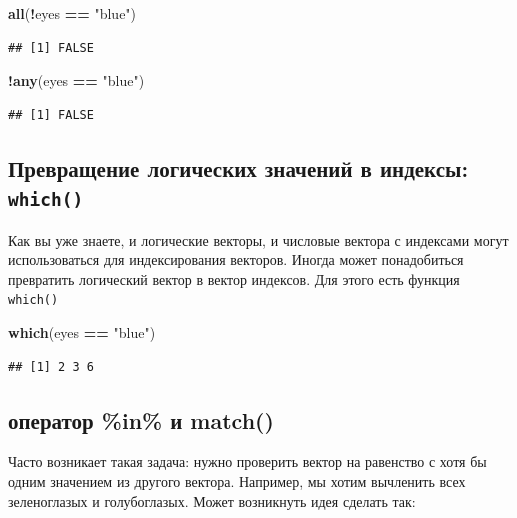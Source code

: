 \documentclass[]{book}
\newenvironment{Shaded}{\begin{snugshade}}{\end{snugshade}}
\newcommand{\KeywordTok}[1]{\textcolor[rgb]{0.13,0.29,0.53}{\textbf{#1}}}
\newcommand{\StringTok}[1]{\textcolor[rgb]{0.31,0.60,0.02}{#1}}
\newcommand{\OperatorTok}[1]{\textcolor[rgb]{0.81,0.36,0.00}{\textbf{#1}}}
\newcommand{\NormalTok}[1]{#1}
\begin{document}
\begin{Shaded}
\begin{Highlighting}[]
\KeywordTok{all}\NormalTok{(}\OperatorTok{!}\NormalTok{eyes }\OperatorTok{==}\StringTok{ "blue"}\NormalTok{)}
\end{Highlighting}
\end{Shaded}

\begin{verbatim}
## [1] FALSE
\end{verbatim}

\begin{Shaded}
\begin{Highlighting}[]
\OperatorTok{!}\KeywordTok{any}\NormalTok{(eyes }\OperatorTok{==}\StringTok{ "blue"}\NormalTok{)}
\end{Highlighting}
\end{Shaded}

\begin{verbatim}
## [1] FALSE
\end{verbatim}

\subsection{\texorpdfstring{Превращение логических значений в индексы:
\texttt{which()}}{Превращение логических значений в индексы: which()}}\label{which}

Как вы уже знаете, и логические векторы, и числовые вектора с индексами
могут использоваться для индексирования векторов. Иногда может
понадобиться превратить логический вектор в вектор индексов. Для этого
есть функция \texttt{which()}

\begin{Shaded}
\begin{Highlighting}[]
\KeywordTok{which}\NormalTok{(eyes }\OperatorTok{==}\StringTok{ "blue"}\NormalTok{)}
\end{Highlighting}
\end{Shaded}

\begin{verbatim}
## [1] 2 3 6
\end{verbatim}

\subsection{оператор \%in\% и match()}\label{in}

Часто возникает такая задача: нужно проверить вектор на равенство с хотя
бы одним значением из другого вектора. Например, мы хотим вычленить всех
зеленоглазых и голубоглазых. Может возникнуть идея сделать так:
\end{document}
